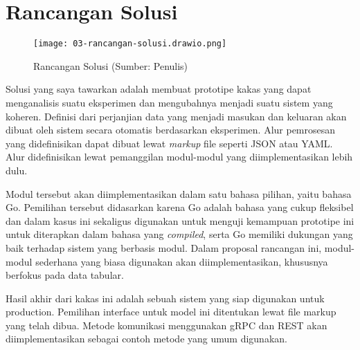 \section{Rancangan Solusi}
\begin{figure}[h]
  \centering
  \texttt{[image: 03-rancangan-solusi.drawio.png]}
  \caption{Rancangan Solusi (Sumber: Penulis)}
\end{figure}

Solusi yang saya tawarkan adalah membuat prototipe kakas yang dapat menganalisis suatu eksperimen dan mengubahnya menjadi suatu sistem yang koheren.
Definisi dari perjanjian data yang menjadi masukan dan keluaran akan dibuat oleh sistem secara otomatis berdasarkan eksperimen.
Alur pemrosesan yang didefinisikan dapat dibuat lewat \textit{markup} file seperti JSON atau YAML.
Alur didefinisikan lewat pemanggilan modul-modul yang diimplementasikan lebih dulu.

Modul tersebut akan diimplementasikan dalam satu bahasa pilihan, yaitu bahasa Go.
Pemilihan tersebut didasarkan karena Go adalah bahasa yang cukup fleksibel dan dalam kasus ini sekaligus digunakan untuk menguji kemampuan prototipe ini untuk diterapkan dalam bahasa yang \textit{compiled}, serta Go memiliki dukungan yang baik terhadap sistem yang berbasis modul.
Dalam proposal rancangan ini, modul-modul sederhana yang biasa digunakan akan diimplementasikan, khususnya berfokus pada data tabular.

Hasil akhir dari kakas ini adalah sebuah sistem yang siap digunakan untuk production.
Pemilihan interface untuk model ini ditentukan lewat file markup yang telah dibua.
Metode komunikasi menggunakan gRPC dan REST akan diimplementasikan sebagai contoh metode yang umum digunakan.

